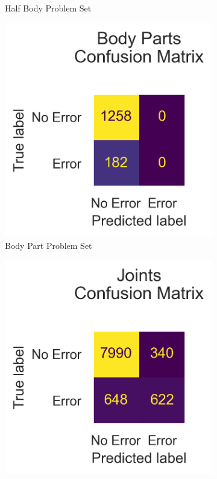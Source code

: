 \begin{figure}[htbp]
\begin{subfigure}[b]{0.4\linewidth}
      \caption{Half Body Problem Set}
      \label{fig:hb_conf}
  \end{subfigure}
  \hfill
  \begin{subfigure}[b]{0.4\linewidth}
      \centering
      \includegraphics[width=\textwidth]{figures/Results/v2/confusion/body_parts_together.png}
      \caption{Body Part Problem Set}
      \label{fig:bp_conf}
  \end{subfigure}
  \hfill
  \begin{subfigure}[b]{0.4\linewidth}
      \centering
      \includegraphics[width=\textwidth]{figures/Results/v2/confusion/joints_together.png}

\end{subfigure}
\end{figure}
